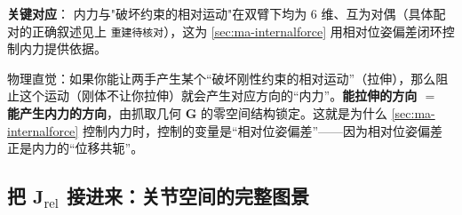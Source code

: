 \noindent\textbf{关键对应}：%
\noindent 内力与"破坏约束的相对运动"在双臂下均为 $6$ 维、互为对偶（具体配对的正确叙述见上 \texttt{重建待核对}），这为 \cref{sec:ma-internalforce} 用相对位姿偏差闭环控制内力提供依据。

\begin{insight}[内力和相对运动是同一枚硬币的两面]
物理直觉：如果你能让两手产生某个“破坏刚性约束的相对运动”（拉伸），那么阻止这个运动（刚体不让你拉伸）就会产生对应方向的“内力”。\textbf{能拉伸的方向 $=$ 能产生内力的方向}，由抓取几何 $\mathbf{G}$ 的零空间结构锁定。这就是为什么 \cref{sec:ma-internalforce} 控制内力时，控制的变量是“相对位姿偏差”——因为相对位姿偏差正是内力的“位移共轭”。
\end{insight}

\subsection{把 $\mathbf{J}_{\text{rel}}$ 接进来：关节空间的完整图景}
\label{sec:ma-jointpicture}

